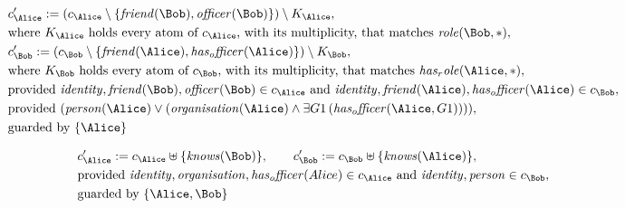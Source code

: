 \begin{align*}
&
c'_
{
\Alice
}
 := 
(c_
{
\Alice
}
 \setminus 
\{
\mathit{
friend
}
(
\Bob
)
,
\mathit{
officer
}
(
\Bob
)
\}
) \setminus K_
{
\Alice
}
,\\
&
\text{where } K_
{
\Alice
}
 \text{ holds every atom of } c_
{
\Alice
}
 \text{, with its multiplicity, that matches } 
\mathit{
role
}
(
\Bob
,
\ast
)
,\\
&
c'_
{
\Bob
}
 := 
(c_
{
\Bob
}
 \setminus 
\{
\mathit{
friend
}
(
\Alice
)
,
\mathit{
has_officer
}
(
\Alice
)
\}
) \setminus K_
{
\Bob
}
,\\
&
\text{where } K_
{
\Bob
}
 \text{ holds every atom of } c_
{
\Bob
}
 \text{, with its multiplicity, that matches } 
\mathit{
has_role
}
(
\Alice
,
\ast
)
,\\
&
\text{provided } 
\mathit{
identity
}
,
\mathit{
friend
}
(
\Bob
)
,
\mathit{
officer
}
(
\Bob
)
 \in c_
{
\Alice
}
 \text{ and } 
\mathit{
identity
}
,
\mathit{
friend
}
(
\Alice
)
,
\mathit{
has_officer
}
(
\Alice
)
 \in c_
{
\Bob
}
,\\
&
\text{provided } 
(
\mathit{
person
}
(
\Alice
)
\lor
(
\mathit{
organisation
}
(
\Alice
)
\land
\exists 
G1
\,(
\mathit{
has_officer
}
(
\Alice
,
G1
)
)
)
)
,\\
&
\text{guarded by } \{
\Alice
\}
\end{align*}

\begin{align*}
&
c'_
{
\Alice
}
 := 
c_
{
\Alice
}
 \uplus 
\{
\mathit{
knows
}
(
\Bob
)
\}
, \qquad 
c'_
{
\Bob
}
 := 
c_
{
\Bob
}
 \uplus 
\{
\mathit{
knows
}
(
\Alice
)
\}
,\\
&
\text{provided } 
\mathit{
identity
}
,
\mathit{
organisation
}
,
\mathit{
has_officer
}
(
Alice
)
 \in c_
{
\Alice
}
 \text{ and } 
\mathit{
identity
}
,
\mathit{
person
}
 \in c_
{
\Bob
}
,\\
&
\text{guarded by } \{
\Alice
,
\Bob
\}
\end{align*}

